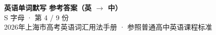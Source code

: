 \documentclass[10pt,a4paper]{article}
\begin{document}
\pagestyle{plain}

\begin{center}
{\LARGE\bfseries 英语单词默写 \quad 参考答案（英 $\to$ 中）}\\[0.22em]
{\large S 字母 · 第 4 / 9 份}\\[0.18em]
{\small 2026年上海市高考英语词汇用法手册 · 参照普通高中英语课程标准}
\end{center}

\vspace{0.2em}
\noindent{\color{rulegray}\rule{\textwidth}{0.8pt}}

\vspace{0.35em}

\vspace{0.25em}
\renewcommand{\arraystretch}{1.32}
\end{document}
